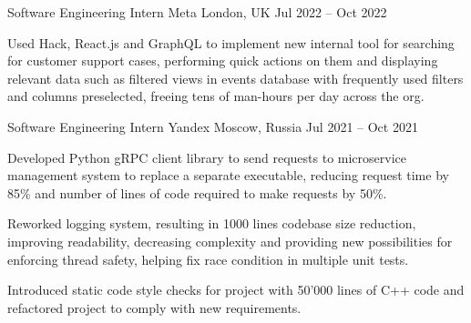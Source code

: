 

\begin{cventries}

  \cventry
  {Software Engineering Intern} %
  {Meta} %
  {London, UK} %
  {Jul 2022 -- Oct 2022} %
  {
    \begin{cvitems} %
      \item Used Hack, React.js and GraphQL to implement new internal tool for searching for customer support cases, performing
      quick actions on them and displaying relevant data such as filtered views in events database with frequently used filters and columns
      preselected, freeing tens of man-hours per day across the org.
    \end{cvitems}
  }

  \cventry
  {Software Engineering Intern} %
  {Yandex} %
  {Moscow, Russia} %
  {Jul 2021 -- Oct 2021} %
  {
    \begin{cvitems} %
      \item Developed Python gRPC client library to send requests to microservice management system to replace a separate executable,
      reducing request time by 85\% and number of lines of code required to make requests by 50\%.
      \item Reworked logging system, resulting in 1000 lines codebase size reduction, improving readability, decreasing complexity
      and providing new possibilities for enforcing thread safety, helping fix race condition in multiple unit tests.
      \item Introduced static code style checks for project with 50'000 lines of C++ code and refactored project to comply with new requirements.
    \end{cvitems}
  }


\end{cventries}
